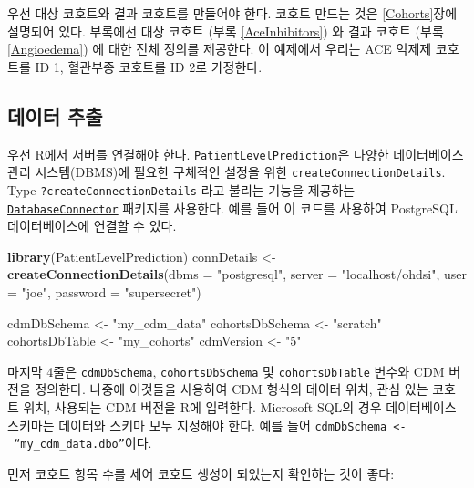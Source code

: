 \documentclass[10.5pt]{book}
\newenvironment{Shaded}{\begin{snugshade}}{\end{snugshade}}
\newcommand{\KeywordTok}[1]{\textcolor[rgb]{0.13,0.29,0.53}{\textbf{#1}}}
\newcommand{\DataTypeTok}[1]{\textcolor[rgb]{0.13,0.29,0.53}{#1}}
\newcommand{\StringTok}[1]{\textcolor[rgb]{0.31,0.60,0.02}{#1}}
\newcommand{\NormalTok}[1]{#1}
\theoremstyle{definition}
\theoremstyle{definition}
\theoremstyle{definition}
\theoremstyle{remark}
\begin{document}
우선 대상 코호트와 결과 코호트를 만들어야 한다. 코호트 만드는 것은
\ref{Cohorts}장에 설명되어 있다. 부록에선 대상 코호트 (부록
\ref{AceInhibitors}) 와 결과 코호트 (부록 \ref{Angioedema}) 에 대한 전체
정의를 제공한다. 이 예제에서 우리는 ACE 억제제 코호트를 ID 1, 혈관부종
코호트를 ID 2로 가정한다.

\subsection{데이터 추출}\label{--2}

우선 R에서 서버를 연결해야 한다.
\href{https://ohdsi.github.io/PatientLevelPrediction/}{\texttt{PatientLevelPrediction}}은
다양한 데이터베이스 관리 시스템(DBMS)에 필요한 구체적인 설정을 위한
\texttt{createConnectionDetails}. Type \texttt{?createConnectionDetails}
라고 불리는 기능을 제공하는
\href{https://ohdsi.github.io/DatabaseConnector/}{\texttt{DatabaseConnector}}
패키지를 사용한다. 예를 들어 이 코드를 사용하여 PostgreSQL
데이터베이스에 연결할 수 있다.

\begin{Shaded}
\begin{Highlighting}[]
\KeywordTok{library}\NormalTok{(PatientLevelPrediction)}
\NormalTok{connDetails <-}\StringTok{ }\KeywordTok{createConnectionDetails}\NormalTok{(}\DataTypeTok{dbms =} \StringTok{"postgresql"}\NormalTok{,}
                                       \DataTypeTok{server =} \StringTok{"localhost/ohdsi"}\NormalTok{,}
                                       \DataTypeTok{user =} \StringTok{"joe"}\NormalTok{,}
                                       \DataTypeTok{password =} \StringTok{"supersecret"}\NormalTok{)}

\NormalTok{cdmDbSchema <-}\StringTok{ "my_cdm_data"}
\NormalTok{cohortsDbSchema <-}\StringTok{ "scratch"}
\NormalTok{cohortsDbTable <-}\StringTok{ "my_cohorts"}
\NormalTok{cdmVersion <-}\StringTok{ "5"}
\end{Highlighting}
\end{Shaded}

마지막 4줄은 \texttt{cdmDbSchema}, \texttt{cohortsDbSchema} 및
\texttt{cohortsDbTable} 변수와 CDM 버전을 정의한다. 나중에 이것들을
사용하여 CDM 형식의 데이터 위치, 관심 있는 코호트 위치, 사용되는 CDM
버전을 R에 입력한다. Microsoft SQL의 경우 데이터베이스 스키마는 데이터와
스키마 모두 지정해야 한다. 예를 들어
\texttt{cdmDbSchema\ \textless{}-\ “my\_cdm\_data.dbo”}이다.

먼저 코호트 항목 수를 세어 코호트 생성이 되었는지 확인하는 것이 좋다:
\end{document}
